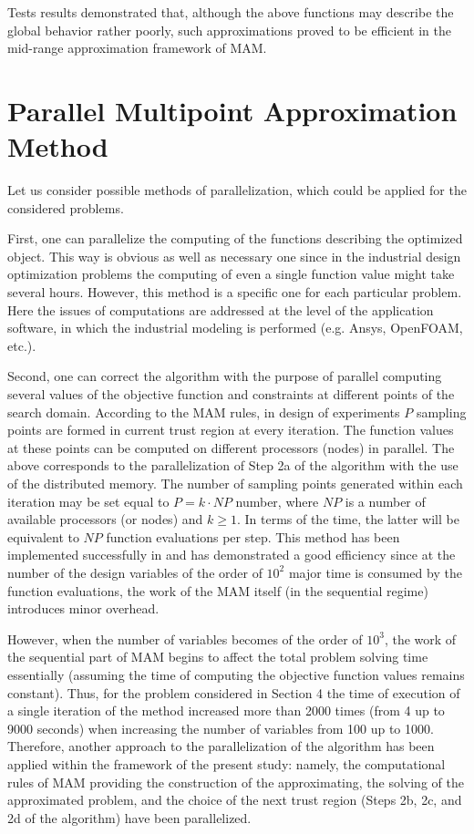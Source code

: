 \documentclass[runningheads,a4paper]{llncs}
\begin{document}
Tests results demonstrated that, although the above functions may describe the global behavior rather poorly, such approximations proved to be efficient in the mid-range approximation framework of MAM.

\section{Parallel Multipoint Approximation Method}\label{sec:par_alg}

Let us consider possible methods of parallelization, which could be applied for the considered problems.

First, one can parallelize the computing of the functions describing the optimized object. This way is obvious as well as necessary one since in the industrial design optimization problems the computing of even a single function value might take several hours. However, this method is a specific one for each particular problem. Here the issues of computations are addressed at the level of the application software, in which the industrial modeling is performed (e.g. Ansys, OpenFOAM, etc.).

Second, one can correct the algorithm with the purpose of parallel computing several values of the objective function and constraints at different points of the search domain. According to the MAM rules, in design of experiments $P$ 
sampling points are formed in current trust region at every iteration. The function values at these points can be computed on different processors (nodes) in parallel. The above corresponds to the parallelization of Step 2a of the algorithm with the use of the distributed memory. The number of sampling points generated within each iteration may be set equal to $P = k\cdot NP$ number, where $NP$ is a number of available processors (or nodes) and $k \geq 1$. In  terms of the time, the latter will be equivalent to $NP$ function evaluations per step. This method has been implemented successfully in \cite{PolynkinToropov2008} and has demonstrated a good efficiency since at the number of the design variables of the order of $10^2$ major time is consumed by the function evaluations, the work of the MAM itself (in the sequential regime) introduces minor overhead.

However, when the number of variables becomes of the order of $10^3$, the work of the sequential part of MAM begins to affect the total problem solving time essentially (assuming the time of computing the objective function 
values remains constant). Thus, for the problem considered in Section 4 the time of execution of a single iteration of the method increased more than 2000 times (from 4 up to 9000 seconds) when increasing the number of variables from 100 up to  1000. Therefore, another approach to the parallelization of the algorithm has been applied within the framework of the 
present study: namely, the computational rules of MAM  providing the construction of the approximating, the solving of the approximated problem, and the choice of the next trust region (Steps 2b, 2c, and 2d of the algorithm) have been parallelized.
\end{document}
